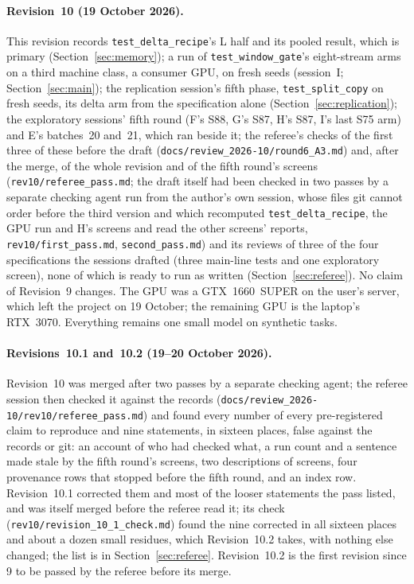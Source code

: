 \documentclass[11pt]{article}
\begin{document}
\paragraph{Revision~10 (19 October 2026).} This revision records \texttt{test\_delta\_recipe}'s L half and its pooled result, which is primary (Section~\ref{sec:memory}); a run of \texttt{test\_window\_gate}'s eight-stream arms on a third machine class, a consumer GPU, on fresh seeds (session~I; Section~\ref{sec:main}); the replication session's fifth phase, \texttt{test\_split\_copy} on fresh seeds, its delta arm from the specification alone (Section~\ref{sec:replication}); the exploratory sessions' fifth round (F's S88, G's S87, H's S87, I's last S75 arm) and E's batches~20 and~21, which ran beside it; the referee's checks of the first three of these before the draft (\texttt{docs/review\_2026-10/round6\_A3.md}) and, after the merge, of the whole revision and of the fifth round's screens (\texttt{rev10/referee\_pass.md}; the draft itself had been checked in two passes by a separate checking agent run from the author's own session, whose files git cannot order before the third version and which recomputed \texttt{test\_delta\_recipe}, the GPU run and H's screens and read the other screens' reports, \texttt{rev10/first\_pass.md}, \texttt{second\_pass.md}) and its reviews of three of the four specifications the sessions drafted (three main-line tests and one exploratory screen), none of which is ready to run as written (Section~\ref{sec:referee}). No claim of Revision~9 changes. The GPU was a GTX~1660~SUPER on the user's server, which left the project on 19 October; the remaining GPU is the laptop's RTX~3070. Everything remains one small model on synthetic tasks.

\paragraph{Revisions~10.1 and~10.2 (19--20 October 2026).} Revision~10 was merged after two passes by a separate checking agent; the referee session then checked it against the records (\texttt{docs/review\_2026-10/rev10/referee\_pass.md}) and found every number of every pre-registered claim to reproduce and nine statements, in sixteen places, false against the records or git: an account of who had checked what, a run count and a sentence made stale by the fifth round's screens, two descriptions of screens, four provenance rows that stopped before the fifth round, and an index row. Revision~10.1 corrected them and most of the looser statements the pass listed, and was itself merged before the referee read it; its check (\texttt{rev10/revision\_10\_1\_check.md}) found the nine corrected in all sixteen places and about a dozen small residues, which Revision~10.2 takes, with nothing else changed; the list is in Section~\ref{sec:referee}. Revision~10.2 is the first revision since 9 to be passed by the referee before its merge.
\end{document}
